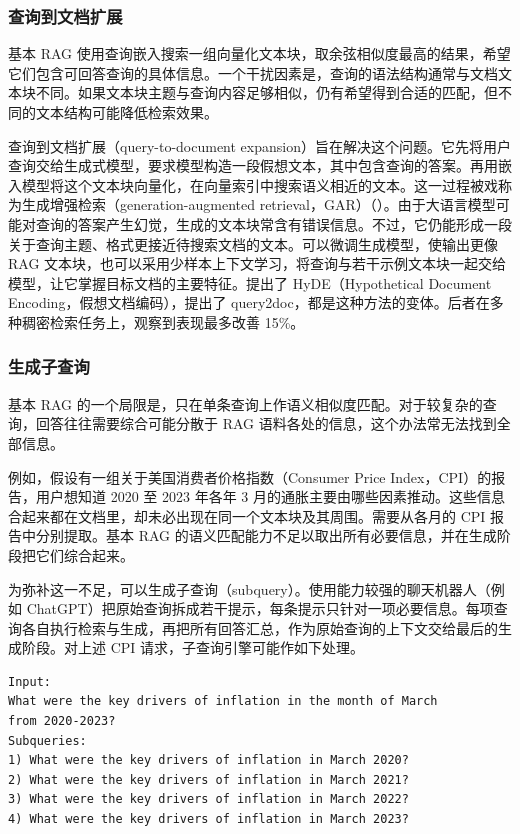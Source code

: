 \subsubsection{查询到文档扩展}
\label{sec:ch07-query-to-doc}
基本 RAG 使用查询嵌入搜索一组向量化文本块，取余弦相似度最高的结果，希望它们包含可回答查询的具体信息。一个干扰因素是，查询的语法结构通常与文档文本块不同。如果文本块主题与查询内容足够相似，仍有希望得到合适的匹配，但不同的文本结构可能降低检索效果。

查询到文档扩展（query-to-document expansion）旨在解决这个问题。它先将用户查询交给生成式模型，要求模型构造一段假想文本，其中包含查询的答案。再用嵌入模型将这个文本块向量化，在向量索引中搜索语义相近的文本。这一过程被戏称为生成增强检索（generation-augmented retrieval，GAR）（）。由于大语言模型可能对查询的答案产生幻觉，生成的文本块常含有错误信息。不过，它仍能形成一段关于查询主题、格式更接近待搜索文档的文本。可以微调生成模型，使输出更像 RAG 文本块，也可以采用少样本上下文学习，将查询与若干示例文本块一起交给模型，让它掌握目标文档的主要特征。提出了 HyDE（Hypothetical Document Encoding，假想文档编码），提出了 query2doc，都是这种方法的变体。后者在多种稠密检索任务上，观察到表现最多改善 15\%。

\subsubsection{生成子查询}
\label{sec:ch07-subqueries}
基本 RAG 的一个局限是，只在单条查询上作语义相似度匹配。对于较复杂的查询，回答往往需要综合可能分散于 RAG 语料各处的信息，这个办法常无法找到全部信息。

例如，假设有一组关于美国消费者价格指数（Consumer Price Index，CPI）的报告，用户想知道 2020 至 2023 年各年 3 月的通胀主要由哪些因素推动。这些信息合起来都在文档里，却未必出现在同一个文本块及其周围。需要从各月的 CPI 报告中分别提取。基本 RAG 的语义匹配能力不足以取出所有必要信息，并在生成阶段把它们综合起来。

为弥补这一不足，可以生成子查询（subquery）。使用能力较强的聊天机器人（例如 ChatGPT）把原始查询拆成若干提示，每条提示只针对一项必要信息。每项查询各自执行检索与生成，再把所有回答汇总，作为原始查询的上下文交给最后的生成阶段。对上述 CPI 请求，子查询引擎可能作如下处理。

\begin{lstlisting}[nolol=true]
Input:
What were the key drivers of inflation in the month of March
from 2020-2023?
Subqueries:
1) What were the key drivers of inflation in March 2020?
2) What were the key drivers of inflation in March 2021?
3) What were the key drivers of inflation in March 2022?
4) What were the key drivers of inflation in March 2023?
\end{lstlisting}

